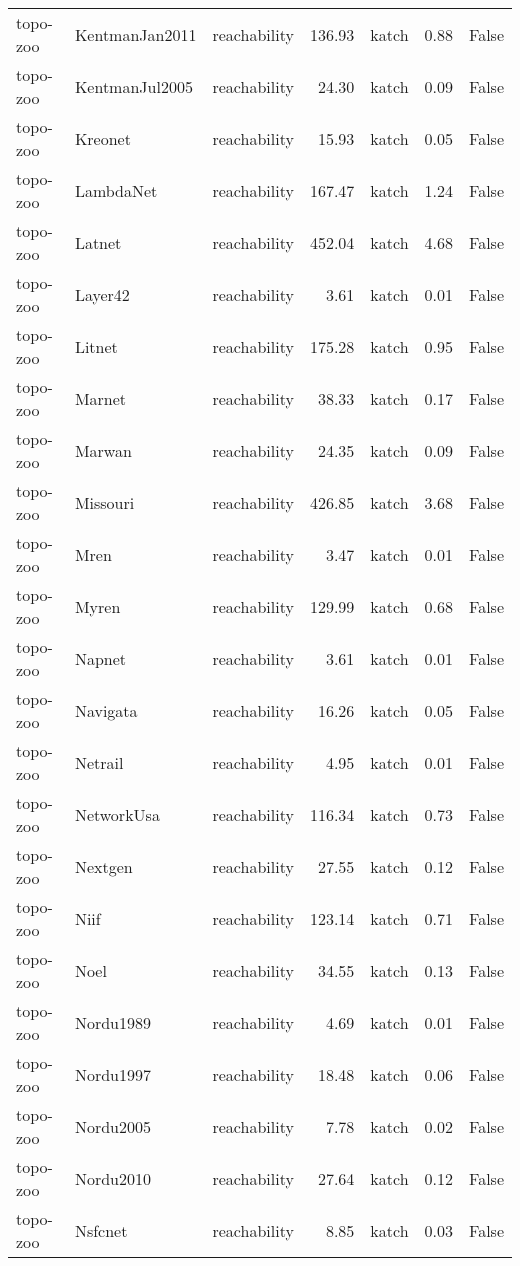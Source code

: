 \begin{tabular}{lllrlrr}
topo-zoo & KentmanJan2011 & reachability & 136.93 & katch & 0.88 & False \\
topo-zoo & KentmanJul2005 & reachability & 24.30 & katch & 0.09 & False \\
topo-zoo & Kreonet & reachability & 15.93 & katch & 0.05 & False \\
topo-zoo & LambdaNet & reachability & 167.47 & katch & 1.24 & False \\
topo-zoo & Latnet & reachability & 452.04 & katch & 4.68 & False \\
topo-zoo & Layer42 & reachability & 3.61 & katch & 0.01 & False \\
topo-zoo & Litnet & reachability & 175.28 & katch & 0.95 & False \\
topo-zoo & Marnet & reachability & 38.33 & katch & 0.17 & False \\
topo-zoo & Marwan & reachability & 24.35 & katch & 0.09 & False \\
topo-zoo & Missouri & reachability & 426.85 & katch & 3.68 & False \\
topo-zoo & Mren & reachability & 3.47 & katch & 0.01 & False \\
topo-zoo & Myren & reachability & 129.99 & katch & 0.68 & False \\
topo-zoo & Napnet & reachability & 3.61 & katch & 0.01 & False \\
topo-zoo & Navigata & reachability & 16.26 & katch & 0.05 & False \\
topo-zoo & Netrail & reachability & 4.95 & katch & 0.01 & False \\
topo-zoo & NetworkUsa & reachability & 116.34 & katch & 0.73 & False \\
topo-zoo & Nextgen & reachability & 27.55 & katch & 0.12 & False \\
topo-zoo & Niif & reachability & 123.14 & katch & 0.71 & False \\
topo-zoo & Noel & reachability & 34.55 & katch & 0.13 & False \\
topo-zoo & Nordu1989 & reachability & 4.69 & katch & 0.01 & False \\
topo-zoo & Nordu1997 & reachability & 18.48 & katch & 0.06 & False \\
topo-zoo & Nordu2005 & reachability & 7.78 & katch & 0.02 & False \\
topo-zoo & Nordu2010 & reachability & 27.64 & katch & 0.12 & False \\
topo-zoo & Nsfcnet & reachability & 8.85 & katch & 0.03 & False \\

\end{tabular}
